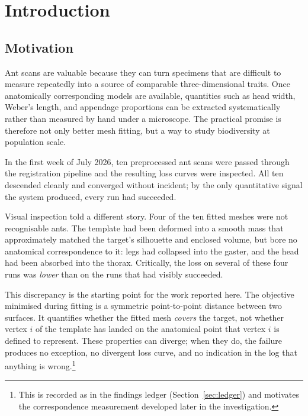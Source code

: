 \chapter{Introduction}
\label{ch:introduction}

\section{Motivation}

Ant scans are valuable because they can turn specimens that are difficult to
measure repeatedly into a source of comparable three-dimensional traits. Once
anatomically corresponding models are available, quantities such as head
width, Weber's length, and appendage proportions can be extracted
systematically rather than measured by hand under a microscope. The practical
promise is therefore not only better mesh fitting, but a way to study
biodiversity at population scale.

In the first week of July 2026, ten preprocessed ant scans were passed through the
registration pipeline and the resulting loss curves were inspected. All ten
descended cleanly and converged without incident; by the only quantitative
signal the system produced, every run had succeeded.

Visual inspection told a different story. Four of the ten fitted meshes were
not recognisable ants. The template had been deformed into a smooth mass that
approximately matched the target's silhouette and enclosed volume, but bore no
anatomical correspondence to it: legs had collapsed into the gaster, and the
head had been absorbed into the thorax. Critically, the loss on several of
these four runs was \emph{lower} than on the runs that had visibly succeeded.

%
This discrepancy is the starting point for the work reported here. The
objective minimised during fitting is a symmetric point-to-point distance
between two surfaces. It quantifies whether the fitted mesh \emph{covers} the
target, not whether vertex $i$ of the template has landed on the anatomical
point that vertex $i$ is defined to represent. These properties can diverge;
when they do, the failure produces no exception, no divergent loss curve, and
no indication in the log that anything is wrong.\footnote{This is recorded as
 in the findings ledger (Section~\ref{sec:ledger}) and motivates the
correspondence measurement developed later in the investigation.}


